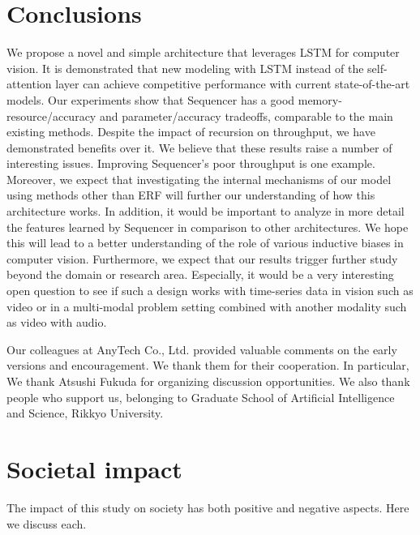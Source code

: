 \documentclass{article}
\begin{document}
\section{Conclusions}
\label{sec:conclusions}
We propose a novel and simple architecture that leverages LSTM for computer vision. It is demonstrated that new modeling with LSTM instead of the self-attention layer can achieve competitive performance with current state-of-the-art models. Our experiments show that Sequencer has a good memory-resource/accuracy and parameter/accuracy tradeoffs, comparable to the main existing methods. Despite the impact of recursion on throughput, we have demonstrated benefits over it. We believe that these results raise a number of interesting issues. Improving Sequencer's poor throughput is one example. Moreover, we expect that investigating the internal mechanisms of our model using methods other than ERF will further our understanding of how this architecture works. In addition, it would be important to analyze in more detail the features learned by Sequencer in comparison to other architectures. We hope this will lead to a better understanding of the role of various inductive biases in computer vision. Furthermore, we expect that our results trigger further study beyond the domain or research area. Especially, it would be a very interesting open question to see if such a design works with time-series data in vision such as video or in a multi-modal problem setting combined with another modality such as video with audio.

\begin{ack}
Our colleagues at AnyTech Co., Ltd. provided valuable comments on the early versions and encouragement. We thank them for their cooperation. In particular, We thank Atsushi Fukuda for organizing discussion opportunities. We also thank people who support us, belonging to Graduate School of Artificial Intelligence and Science, Rikkyo University.
\end{ack}

{
\small


}



\clearpage
\appendix

\section{Societal impact}
\label{sec:societal_impact}
The impact of this study on society has both positive and negative aspects. Here we discuss each.
\end{document}
